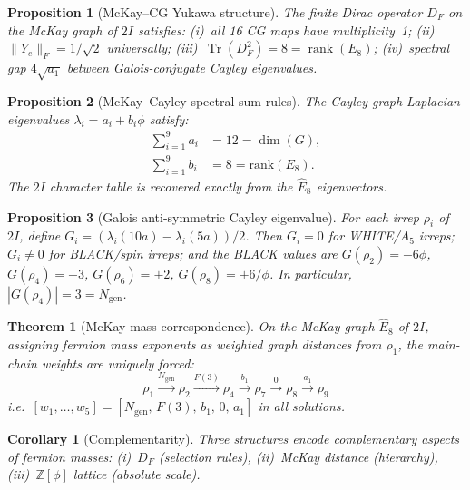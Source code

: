 \documentclass[12pt,a4paper]{article}
\newtheorem{theorem}{Theorem}
\newtheorem{proposition}{Proposition}
\newtheorem{corollary}{Corollary}
\theoremstyle{definition}
\begin{document}
\begin{proposition}[McKay--CG Yukawa structure]\label{prop:mckay_df}
The finite Dirac operator $D_F$ on the McKay graph of $2I$ satisfies:
(i)~all 16 CG maps have multiplicity~1;
(ii)~$\|Y_e\|_F = 1/\sqrt{2}$ universally;
(iii)~$\operatorname{Tr}(D_F^2) = 8 = \operatorname{rank}(E_8)$;
(iv)~spectral gap $4\sqrt{a_1}$ between Galois-conjugate Cayley eigenvalues.
\end{proposition}

\begin{proposition}[McKay--Cayley spectral sum rules]\label{prop:mckay_sumrules}
The Cayley-graph Laplacian eigenvalues $\lambda_i = a_i + b_i\phi$ satisfy:
\begin{align}
\sum_{i=1}^{9} a_i &= 12 = \dim(G), \label{eq:sumrule_a} \\
\sum_{i=1}^{9} b_i &= 8 = \mathrm{rank}(E_8). \label{eq:sumrule_b}
\end{align}
The $2I$ character table is recovered exactly from the $\hat{E}_8$ eigenvectors.
\end{proposition}

\begin{proposition}[Galois anti-symmetric Cayley eigenvalue]\label{prop:galois_antisym}
For each irrep $\rho_i$ of $2I$, define $G_i = (\lambda_i(10a) - \lambda_i(5a))/2$.  Then $G_i = 0$ for WHITE/$A_5$ irreps; $G_i \neq 0$ for BLACK/spin irreps; and the BLACK values are
$G(\rho_2) = -6\phi$, $G(\rho_4) = -3$, $G(\rho_6) = +2$, $G(\rho_8) = +6/\phi$.
In particular, $|G(\rho_4)| = 3 = N_{\text{gen}}$.
\label{eq:galois_antisym}
\end{proposition}

\begin{theorem}[McKay mass correspondence]\label{thm:mckay_mass}
On the McKay graph $\hat{E}_8$ of $2I$, assigning fermion mass exponents as weighted graph distances from $\rho_1$, the main-chain weights are \emph{uniquely forced}:
\begin{equation}\label{eq:main_chain}
\rho_1 \xrightarrow{N_{\mathrm{gen}}} \rho_2 \xrightarrow{F(3)} \rho_4
\xrightarrow{b_1} \rho_7 \xrightarrow{0} \rho_8
\xrightarrow{a_1} \rho_9
\end{equation}
i.e.\ $[w_1,\ldots,w_5] = [N_{\mathrm{gen}},\, F(3),\, b_1,\, 0,\, a_1]$ in all solutions.
\end{theorem}

\begin{corollary}[Complementarity]\label{cor:complementarity}
Three structures encode complementary aspects of fermion masses:
(i)~$D_F$ (selection rules), (ii)~McKay distance (hierarchy), (iii)~$\mathbb{Z}[\phi]$ lattice (absolute scale).
\end{corollary}
\end{document}
